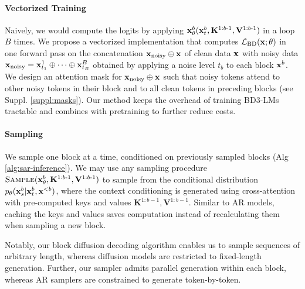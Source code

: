 \documentclass{article} %
\def\algos{BD3-LMs}
\begin{document}
\paragraph{Vectorized Training}

Naively, we would compute the logits by applying ${\mathbf x}_\theta^b({\mathbf x}_{t}^b,  \mathbf{K}^{1:b\text{-}1}, \mathbf{V}^{1:b\text{-}1})$ in a loop $B$ times. We propose a vectorized implementation that computes $\mathcal{L}_\text{BD}({\mathbf x}; \theta)$ in one forward pass on the concatenation ${\mathbf x}_\text{noisy} \oplus {\mathbf x}$ of clean data ${\mathbf x}$ with  noisy data ${\mathbf x}_\text{noisy} = {\mathbf x}^1_{t_1} \oplus \dots \oplus {\mathbf x}^B_{t_B}$ obtained by applying a noise level $t_b$ to each block ${\mathbf x}^b$. We design an attention mask for ${\mathbf x}_\text{noisy} \oplus {\mathbf x}$ such that noisy tokens attend to other noisy tokens in their block and to all clean tokens in preceding blocks
(see Suppl. \ref{suppl:masks}).  Our method keeps the overhead of training \algos{} tractable and combines with pretraining to further reduce costs.



\paragraph{Sampling} We sample one block at a time, conditioned on previously sampled blocks (Alg \ref{alg:sar-inference}). We may use any sampling procedure $ \textsc{Sample}({\mathbf x}_\theta^b, \mathbf{K}^{1:b\text{-}1},\mathbf{V}^{1:b\text{-}1})$ to sample from the conditional distribution $p_\theta({\mathbf x}_{s}^b | {\mathbf x}_{t}^b, {\mathbf x}^{<b})$, where the context conditioning is generated using cross-attention with pre-computed keys and values $\mathbf{K}^{1:b-1}, \mathbf{V}^{1:b-1}$. Similar to AR models, caching the keys and values saves computation instead of recalculating them when sampling a new block.

Notably, our block diffusion decoding algorithm enables us to sample sequences of arbitrary length, whereas diffusion models are restricted to fixed-length generation. Further, our sampler admits parallel generation within each block, whereas AR samplers are constrained to generate token-by-token.
\end{document}
